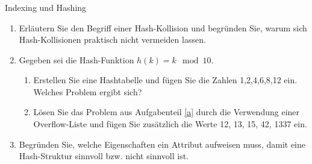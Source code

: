 \begin{frame}[t]
\frametitle{\insertsection}
\begin{alertblock}{Indexing und Hashing}
\begin{enumerate}
\item Erläutern Sie den Begriff einer Hash-Kollision und begründen Sie, warum sich Hash-Kollisionen praktisch nicht vermeiden lassen.
\item Gegeben sei die Hash-Funktion $h(k)=k \mod 10$.
\begin{enumerate}
\item \label{a} Erstellen Sie eine Hashtabelle und fügen Sie die Zahlen 1,2,4,6,8,12 ein. Welches Problem ergibt sich?
\item Lösen Sie das Problem aus Aufgabenteil \ref{a} durch die Verwendung einer Overflow-Liste und fügen Sie zusätzlich die Werte 12, 13, 15, 42, 1337 ein.
\end{enumerate}
\item Begründen Sie, welche Eigenschaften ein Attribut aufweisen muss, damit eine Hash-Struktur sinnvoll  bzw. nicht  sinnvoll ist. 
\end{enumerate}
\end{alertblock}
\end{frame}

